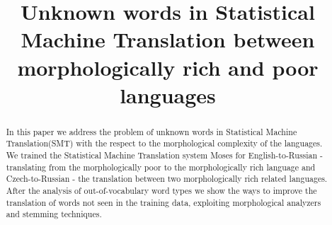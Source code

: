 \documentclass[11pt,letterpaper]{article}
\title{Unknown words in Statistical Machine Translation between morphologically
rich and poor languages}
\date{}
\begin{document}
\maketitle
\begin{abstract}
In this paper we address the problem of unknown words in Statistical
Machine Translation(SMT) with the respect to the morphological complexity of
the languages. We trained the Statistical Machine Translation system Moses
for English-to-Russian - translating from the morphologically poor to the
morphologically rich language and Czech-to-Russian - the translation
between two morphologically rich related languages. After the analysis of
out-of-vocabulary word types we show the ways to improve the translation
of words not seen in the training data, exploiting morphological analyzers
and stemming techniques.
\end{abstract}
\end{document}
